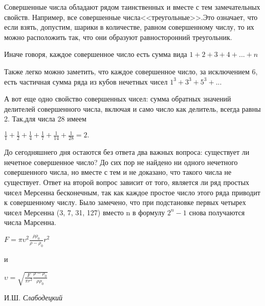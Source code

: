 \begin{multicols*}{2}
Совершенные числа обладают рядом таинственных и вместе с тем замечательных свойств. Например, все совершенные числа<<треугольные>>.Это означает, что если взять, допустим, шарики в количестве, равном совершенному числу, то их можно расположить так, что они образуют равносторонний треугольник.\par
Иначе говоря,  каждое совершенное число есть сумма вида $1 + 2 + 3 + 4 + ... + n$\par
Также легко можно заметить, что каждое совершенное число, за исключением 6, есть частичная сумма ряда из кубов нечетных чисел $1^3 + 3^3 + 5^3 + ...$\par
А вот еще одно свойство совершенных чисел: сумма обратных значений делителей совершенного числа, включая и само число как делитель, всегда равны 2. Так,для числа 28 имеем\\\par
$\frac{1}{1} + \frac{1}{2} + \frac{1}{4} + \frac{1}{7} + \frac{1}{14} + \frac{1}{28} = 2.$\\\par
До сегодняшнего дня остаются без ответа два важных вопроса: существует ли нечетное совершенное число?
До сих пор не найдено ни одного нечетного совершенного числа, но вместе с тем и не доказано, что такого числа не существует. Ответ на второй вопрос зависит от того, является ли ряд простых чисел Мерсенна бесконечным, так как каждое простое число этого ряда приводит к совершенному числу. Было замечено, что при подстановке первых четырех чисел Мерсенна (3, 7, 31, 127) вместо n в формулу $2^n - 1$ снова получаются числа Марсенна.\\
\begin{center}
	\fontsize{19pt}{0}
$F = \pi\upsilon^2\frac{\rho\rho_0}{\rho - \rho_0}r^2$\\
\end{center}
и\\
\begin{center}
	\fontsize{19pt}{0}
$\upsilon = \sqrt{\frac{F}{\pi r^2} \frac{\rho - \rho_0}{\rho\rho_0}}$
\end{center}
\begin{flushright}
	И.Ш. \textit{Слабодецкий}
\end{flushright}
\end{multicols*}
